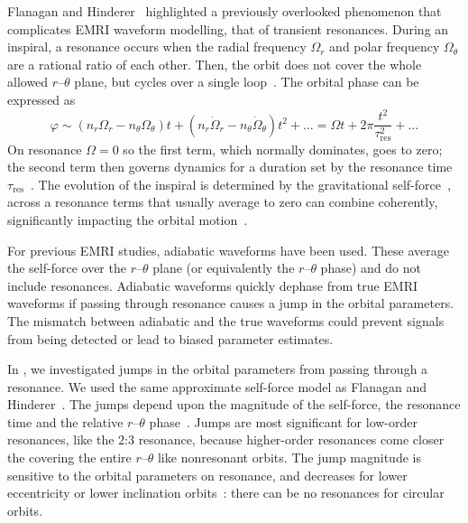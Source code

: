 \documentclass[a4paper]{jpconf}
\begin{document}
Flanagan and Hinderer~\cite{Flanagan2012} highlighted a previously overlooked phenomenon that complicates EMRI waveform modelling, that of transient resonances. During an inspiral, a resonance occurs when the radial frequency $\Omega_r$ and polar frequency $\Omega_\theta$ are a rational ratio of each other. Then, the orbit does not cover the whole allowed $r$--$\theta$ plane, but cycles over a single loop~\cite{Grossman2012}. The orbital phase can be expressed as
\begin{equation}
\varphi {} \sim {} \left(n_r \Omega_r - n_\theta \Omega_\theta\right) t + \left(n_r \dot{\Omega}_r - n_\theta \dot{\Omega}_\theta\right)t^2 + \ldots = \Omega t + 2\pi \frac{t^2}{\tau_\mathrm{res}^2} + \ldots
\end{equation}
On resonance $\Omega = 0$ so the first term, which normally dominates, goes to zero; the second term then governs dynamics for a duration set by the resonance time $\tau_\mathrm{res}$~\cite{Ruangsri2014,Berry2016a}. The evolution of the inspiral is determined by the gravitational self-force~\cite{Barack2009}, across a resonance terms that usually average to zero can combine coherently, significantly impacting the orbital motion~\cite{Flanagan2012}.

For previous EMRI studies, adiabatic waveforms have been used. These average the self-force over the $r$--$\theta$ plane (or equivalently the $r$--$\theta$ phase) and do not include resonances. Adiabatic waveforms quickly dephase from true EMRI waveforms if passing through resonance causes a jump in the orbital parameters. The mismatch between adiabatic and the true waveforms could prevent signals from being detected or lead to biased parameter estimates.

In \cite{Berry2016a}, we investigated jumps in the orbital parameters from passing through a resonance. We used the same approximate self-force model as Flanagan and Hinderer~\cite{Flanagan2012}. The jumps depend upon the magnitude of the self-force, the resonance time and the relative $r$--$\theta$ phase~\cite{Kevorkian1987,VanDeMeent2013,Berry2016a}. Jumps are most significant for low-order resonances, like the $2$:$3$ resonance, because higher-order resonances come closer the covering the entire $r$--$\theta$ like nonresonant orbits. The jump magnitude is sensitive to the orbital parameters on resonance, and decreases for lower eccentricity or lower inclination orbits~\cite{Flanagan2012a}: there can be no resonances for circular orbits.

\end{document}
